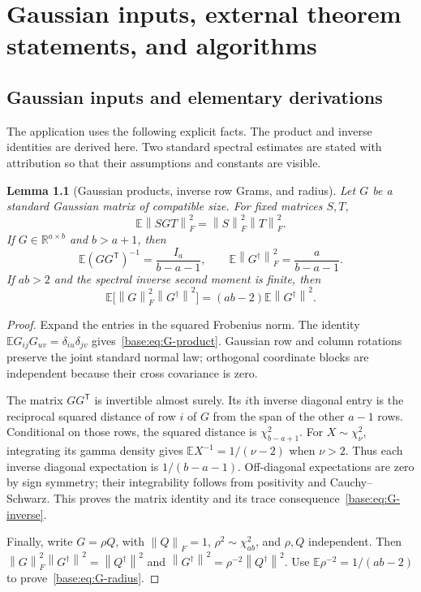 \documentclass[11pt,oneside,openany,a4paper]{book}
\numberwithin{equation}{chapter}
\newtheorem{lemma}[theorem]{Lemma}
\theoremstyle{definition}
\theoremstyle{remark}
\newcommand{\R}{\mathbb R}\newcommand{\E}{\mathbb E}\newcommand{\Prb}{\mathbb P}\newcommand{\PP}{\mathbb P}
\newcommand{\T}{\mathsf T}\newcommand{\Id}{I}
\newcommand{\F}[1]{\left\lVert#1\right\rVert_F}
\newcommand{\N}[1]{\left\lVert#1\right\rVert}
\begin{document}
\chapter{Gaussian inputs, external theorem statements, and algorithms}\label{ch:external}
\section{Gaussian inputs and elementary derivations}\label{base:app:gaussian}
The application uses the following explicit facts. The product and inverse
identities are derived here. Two standard spectral estimates are stated
with attribution so that their assumptions and constants are visible.

\begin{lemma}[Gaussian products, inverse row Grams, and radius]
\label{base:lem:gaussian-basic}
Let $G$ be a standard Gaussian matrix of compatible size.
For fixed matrices $S,T$,
\begin{equation}\label{base:eq:G-product}
 \E\F{SGT}^2=\F S^2\F T^2.
\end{equation}
If $G\in\R^{a\times b}$ and $b>a+1$, then
\begin{equation}\label{base:eq:G-inverse}
 \E(GG^{\T})^{-1}=\frac{I_a}{b-a-1},\qquad
 \E\F{G^\dagger}^2=\frac{a}{b-a-1}.
\end{equation}
If $ab>2$ and the spectral inverse second moment is finite, then
\begin{equation}\label{base:eq:G-radius}
 \E\bigl[\F G^2\N{G^\dagger}^2\bigr]
 =(ab-2)\E\N{G^\dagger}^2.
\end{equation}
\end{lemma}
\begin{proof}
Expand the entries in the squared Frobenius norm. The identity
$\E G_{ij}G_{uv}=\delta_{iu}\delta_{jv}$ gives~\eqref{base:eq:G-product}.
Gaussian row and column rotations preserve the joint standard normal law;
orthogonal coordinate blocks are independent because their cross covariance
is zero.

The matrix $GG^{\T}$ is invertible almost surely. Its $i$th inverse diagonal
entry is the reciprocal squared distance of row $i$ of $G$ from the span of
the other $a-1$ rows. Conditional on those rows, the squared distance is
$\chi^2_{b-a+1}$. For $X\sim\chi^2_\nu$, integrating its gamma density gives
$\E X^{-1}=1/(\nu-2)$ when $\nu>2$. Thus each inverse diagonal expectation
is $1/(b-a-1)$. Off-diagonal expectations are zero by sign symmetry; their
integrability follows from positivity and Cauchy--Schwarz. This proves the
matrix identity and its trace consequence~\eqref{base:eq:G-inverse}.

Finally, write $G=\rho Q$, with $\F Q=1$, $\rho^2\sim\chi^2_{ab}$,
and $\rho,Q$ independent. Then
$\F G^2\N{G^\dagger}^2=\N{Q^\dagger}^2$ and
$\N{G^\dagger}^2=\rho^{-2}\N{Q^\dagger}^2$.
Use $\E\rho^{-2}=1/(ab-2)$ to prove~\eqref{base:eq:G-radius}.
\end{proof}
\end{document}
